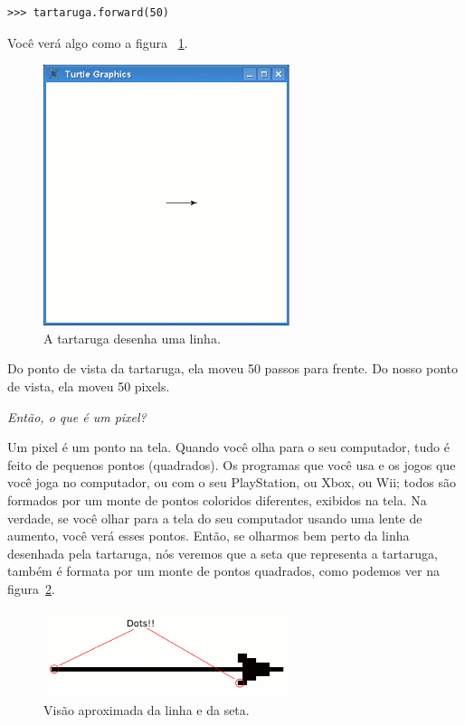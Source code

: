 \begin{listing}
\begin{verbatim}
>>> tartaruga.forward(50)
\end{verbatim}
\end{listing}

Você verá algo como a figura ~\ref{fig11}.

\begin{figure}
\begin{center}
\includegraphics[width=72mm]{eps/figure11.eps}
\end{center}
\caption{A tartaruga desenha uma linha.}\label{fig11}
\end{figure}

Do ponto de vista da tartaruga, ela moveu 50 passos para frente. Do nosso ponto de vista, ela moveu 50 pixels.

\noindent
\emph{Então, o que é um pixel?}

Um pixel é um ponto na tela. Quando você olha para o seu computador, tudo é feito de pequenos pontos (quadrados). Os programas que você usa e os jogos que você joga no computador, ou com o seu PlayStation, ou Xbox, ou Wii; todos são formados por um monte de pontos coloridos diferentes, exibidos na tela. Na verdade, se você olhar para a tela do seu computador usando uma lente de aumento, você verá esses pontos. Então, se olharmos bem perto da linha desenhada pela tartaruga, nós veremos que a seta que representa a tartaruga, também é formata por um monte de pontos quadrados, como podemos ver na figura~\ref{fig12}.

\begin{figure}
\begin{center}
\includegraphics[width=72mm]{eps/figure12.eps}
\end{center}
\caption{Visão aproximada da linha e da seta.}\label{fig12}
\end{figure}

